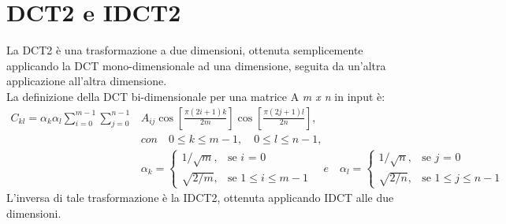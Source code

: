 \documentclass[a4paper,12pt]{report}
\begin{document}
\section{DCT2 e IDCT2}
La DCT2 è una trasformazione a due dimensioni, ottenuta semplicemente applicando la DCT mono-dimensionale ad una dimensione, seguita da un'altra applicazione all'altra dimensione.\\
La definizione della DCT bi-dimensionale per una matrice A \textit{m x n} in input è:\\
\begin{align*}
C_{kl} = \alpha_k \alpha_l \sum_{i=0}^{m-1} \sum_{j=0}^{n-1}&A_{ij} \cos \left[\frac{\pi \left(2i + 1\right) k }{2m}\right] \cos \left[\frac{\pi \left(2j + 1\right) l }{2n}\right],\\
&con \quad 0 \leq k \leq m - 1, \quad 0 \leq l \leq n - 1,\\
&\alpha_k = \begin{cases} 1/\sqrt{m}, & \mbox{se } i\mbox{ = 0} \\ \sqrt{2/m}, & \mbox{se } \mbox{\(1 \leq i \leq m - 1\)} \end{cases} \quad e \quad \alpha_l = \begin{cases} 1/\sqrt{n}, & \mbox{se } j\mbox{ = 0} \\ \sqrt{2/n}, & \mbox{se } \mbox{\(1 \leq j \leq n - 1\)} \end{cases}
\end{align*}
L'inversa di tale trasformazione è la IDCT2, ottenuta applicando IDCT alle due dimensioni.
\end{document}

